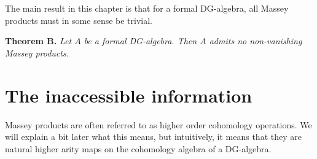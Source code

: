 The main result in this chapter is that for a formal DG-algebra, all Massey products must in some sense be trivial. 

\textbf{Theorem B. } \textit{Let $A$ be a formal DG-algebra. Then $A$ admits no non-vanishing Massey products.}



\section{The inaccessible information}

Massey products are often referred to as higher order cohomology operations. We will explain a bit later what this means, but intuitively, it means that they are natural higher arity maps on the cohomology algebra of a DG-algebra. 

